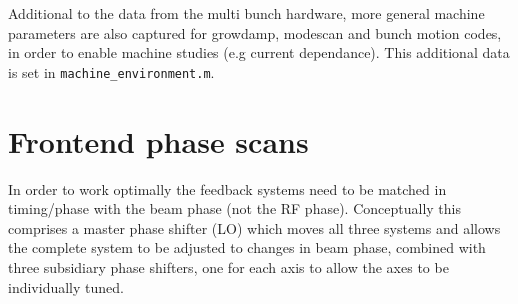 \documentclass{report}
\begin{document}
Additional to the data from the multi bunch hardware, more general machine parameters are also captured for growdamp, modescan and bunch motion codes, in order to enable machine studies (e.g current dependance). This additional data is set in \verb|machine_environment.m|.


\chapter{Frontend phase scans}
In order to work optimally the feedback systems need to be matched in timing/phase with the beam phase (not the RF phase). Conceptually this comprises a master phase shifter (LO) which moves all three systems and allows the complete system to be adjusted to changes in beam phase, combined with three subsidiary phase shifters, one for each axis to allow the axes to be individually tuned.
\end{document}
